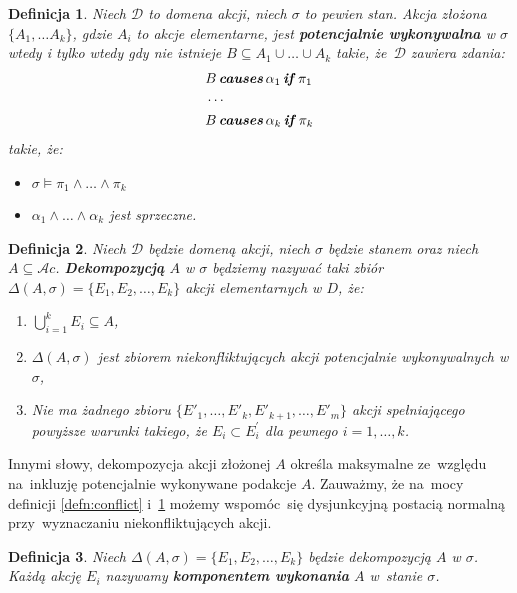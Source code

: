 \documentclass[11pt,a4paper]{article}
\newtheorem{defn}{Definicja}
\DeclareMathOperator{\Causes}{\textbf{\textit{causes}}}
\DeclareMathOperator{\If}{\textbf{\textit{if}}}
\begin{document}
\begin{defn}
    \label{defn:potentially-executable}
    Niech $\mathcal{D}$ to domena akcji, niech $\sigma$ to pewien stan. Akcja złożona $\{ A_1, \dots A_k \}$, gdzie $A_i$ to akcje elementarne, jest \textbf{potencjalnie wykonywalna} w $\sigma$ wtedy i tylko wtedy gdy nie istnieje $B \subseteq A_1 \cup \dots \cup A_k$ takie, że~$\mathcal{D}$ zawiera zdania:
    \begin{align*}
        & B \Causes \alpha_1 \If \pi_1 \\
        & \cdots \\
        & B \Causes \alpha_k \If \pi_k
    \end{align*}
    takie, że:
    \begin{itemize}
        \item $\sigma \models \pi_1 \land \dots \land \pi_k$
        \item $\alpha_1 \land \dots \land \alpha_k$ jest sprzeczne.
    \end{itemize}
\end{defn}

\begin{defn}
    \label{defn:decomposition}
    Niech $\mathcal{D}$ będzie domeną akcji, niech $\sigma$ będzie stanem oraz niech $A \subseteq \mathcal{A}c$.
    \textbf{Dekompozycją} $A$ w $\sigma$ będziemy nazywać taki zbiór $\Delta(A, \sigma) = \{ E_1, E_2, \dots, E_k \}$ akcji elementarnych w $D$, że:
    \begin{enumerate}
        \item $\bigcup_{i = 1}^{k} E_i \subseteq A$,
        \item $\Delta(A, \sigma)$ jest zbiorem niekonfliktujących akcji potencjalnie wykonywalnych w  $\sigma$,
        \item Nie ma żadnego zbioru $\{ E'_1, \dots, E'_k, E'_{k+1}, \dots, E'_m \}$ akcji spełniającego powyższe warunki takiego, że $E_i \subset E_i^\prime$ dla pewnego $i = 1, \dots, k$.
    \end{enumerate}
\end{defn}

Innymi słowy, dekompozycja akcji złożonej $A$ określa maksymalne ze~względu na~inkluzję potencjalnie wykonywane podakcje $A$.
Zauważmy, że na~mocy definicji \ref{defn:conflict} i~\ref{defn:potentially-executable} możemy wspomóc~się dysjunkcyjną postacią normalną przy~wyznaczaniu niekonfliktujących akcji.
    
\begin{defn}
    \label{defn:execution-component}
    Niech $\Delta(A, \sigma) = \{ E_1, E_2, \dots, E_k \}$ będzie dekompozycją $A$ w $\sigma$. Każdą akcję $E_i$ nazywamy \textbf{komponentem wykonania} $A$ w~stanie $\sigma$.
\end{defn}
    
\end{document}
